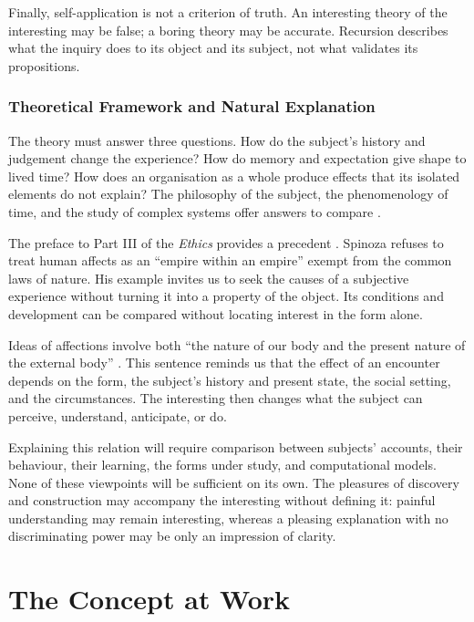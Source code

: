\documentclass[11pt,a4paper]{article}
\begin{document}
Finally, self-application is not a criterion of truth. An interesting theory of
the interesting may be false; a boring theory may be accurate. Recursion
describes what the inquiry does to its object and its subject, not what validates
its propositions.

\section{Theoretical Framework and Natural Explanation}

The theory must answer three questions. How do the subject's history and
judgement change the experience? How do memory and expectation give shape to
lived time? How does an organisation as a whole produce effects that its
isolated elements do not explain? The philosophy of the subject, the
phenomenology of time, and the study of complex systems offer answers to compare
\parencite{petitot1993phenomenologie,petitot2002naturaliser}.

The preface to Part III of the \emph{Ethics} provides a precedent
\parencite{spinoza1966ethique}. Spinoza refuses to
treat human affects as an ``empire within an empire'' exempt from the common
laws of nature. His example invites us to seek the causes of a subjective
experience without turning it into a property of the object. Its conditions
and development can be compared without locating interest in the form alone.

Ideas of affections involve both ``the nature of our body and the present nature
of the external body''
\parencite[III, prop. XXVII, dem.]{spinoza1861oeuvres}. This sentence reminds us
that the effect of an encounter depends on the form, the subject's history and
present state, the social setting, and the circumstances. The interesting then
changes what the subject can perceive, understand, anticipate, or do.

Explaining this relation will require comparison between subjects' accounts,
their behaviour, their learning, the forms under study, and computational
models. None of these viewpoints will be sufficient on its own. The pleasures
of discovery and construction
\parencite{feynman1999pleasure,florman1996existential} may accompany the
interesting without defining it: painful understanding may remain interesting,
whereas a pleasing explanation with no discriminating power may be only an
impression of clarity.

\part{The Concept at Work}
\end{document}
